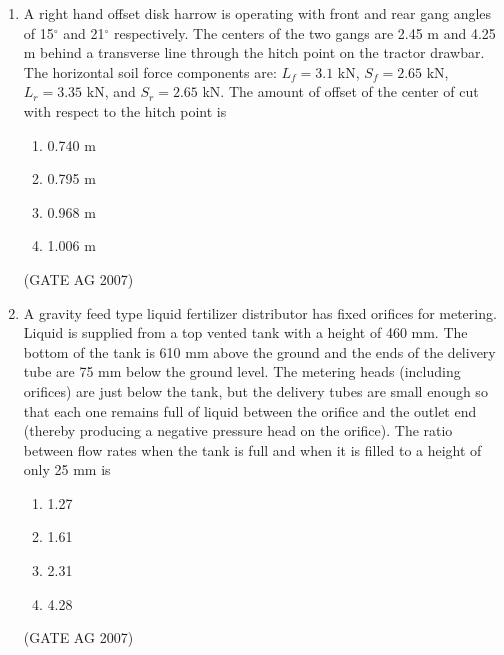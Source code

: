 \documentclass[journal,12pt,onecolumn]{IEEEtran}
\theoremstyle{remark}
\begin{document}
\begin{enumerate}
\begin{multicols}{4}
\begin{enumerate}
    \item 5.02 mm
    \item 11.98 mm
    \item 47.94 mm
    \item 301.20 mm
\end{enumerate}
\end{multicols}
\hfill(GATE AG 2007)



\item A right hand offset disk harrow is operating with front and rear gang angles of 15$^\circ$ and 21$^\circ$ respectively. The centers of the two gangs are 2.45 m and 4.25 m behind a transverse line through the hitch point on the tractor drawbar. The horizontal soil force components are: $L_f = 3.1$ kN, $S_f = 2.65$ kN, $L_r = 3.35$ kN, and $S_r = 2.65$ kN. The amount of offset of the center of cut with respect to the hitch point is

\begin{multicols}{4}
\begin{enumerate}
    \item 0.740 m
    \item 0.795 m
    \item 0.968 m
    \item 1.006 m
\end{enumerate}
\end{multicols}
\hfill(GATE AG 2007)

\item A gravity feed type liquid fertilizer distributor has fixed orifices for metering. Liquid is supplied from a top vented tank with a height of 460 mm. The bottom of the tank is 610 mm above the ground and the ends of the delivery tube are 75 mm below the ground level. The metering heads (including orifices) are just below the tank, but the delivery tubes are small enough so that each one remains full of liquid between the orifice and the outlet end (thereby producing a negative pressure head on the orifice). The ratio between flow rates when the tank is full and when it is filled to a height of only 25 mm is  

\begin{multicols}{4}
\begin{enumerate}

    \item 1.27
    \item 1.61
    \item 2.31
    \item 4.28
\end{enumerate}
\end{multicols}
\hfill(GATE AG 2007)


\end{enumerate}
\end{document}
